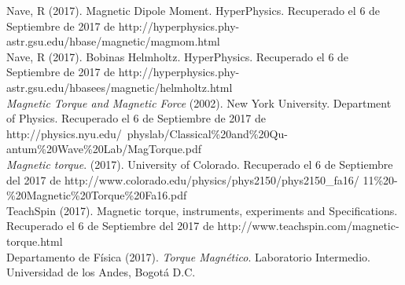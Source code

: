 \documentclass[%
 reprint,
 amsmath,amssymb,
 aps,
]{revtex4-1}
\begin{document}
\begin{thebibliography}{}

 Nave, R (2017). Magnetic Dipole Moment. HyperPhysics. Recuperado el 6 de Septiembre de 2017 de http://hyperphysics.phy-astr.gsu.edu/hbase/magnetic/magmom.html\\

 Nave, R (2017). Bobinas Helmholtz. HyperPhysics. Recuperado el 6 de Septiembre de 2017 de http://hyperphysics.phy-astr.gsu.edu/hbasees/magnetic/helmholtz.html\\

 \textit{Magnetic Torque and Magnetic Force} (2002). New York University. Department of Physics. Recuperado el 6 de Septiembre de 2017 de http://physics.nyu.edu/~physlab/Classical\%20and\%20Qu-
antum\%20Wave\%20Lab/MagTorque.pdf\\

 \textit{Magnetic torque}. (2017). University of Colorado. Recuperado el 6 de Septiembre del 2017 de http://www.colorado.edu/physics/phys2150/phys2150\_fa16/
11\%20-\%20Magnetic\%20Torque\%20Fa16.pdf\\

 TeachSpin (2017). Magnetic torque, instruments, experiments and Specifications. Recuperado el 6 de Septiembre del 2017 de http://www.teachspin.com/magnetic-torque.html\\

 Departamento de Física (2017). \textit{Torque Magnético}. Laboratorio Intermedio. Universidad de los Andes, Bogotá D.C.

\end{thebibliography}
\end{document}
